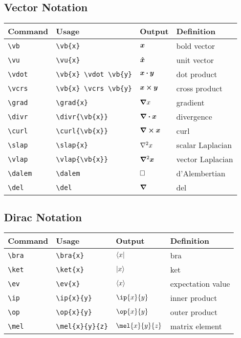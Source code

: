 \documentclass[11pt]{article}
\begin{document}
\subsection{Vector Notation}

\begin{tabular}{llll}
    Command       & Usage                      & Output                & Definition       \\
    \hline
    \verb|\vb|    & \verb|\vb{x}|              & $\bm{x}$              & bold vector      \\
    \verb|\vu|    & \verb|\vu{x}|              & $\bm{\hat{x}}$              & unit vector      \\
    \verb|\vdot|  & \verb|\vb{x} \vdot \vb{y}| & $\bm{x} \bm{\cdot} \bm{y}$ & dot product      \\
    \verb|\vcrs|  & \verb|\vb{x} \vcrs \vb{y}| & $\bm{x} \bm{\times} \bm{y}$ & cross product    \\
    \verb|\grad|  & \verb|\grad{x}|            & $\bm{\nabla} x$            & gradient         \\
    \verb|\divr|  & \verb|\divr{\vb{x}}|       & $\bm{\nabla} \bm{\cdot} \bm{x}$       & divergence       \\
    \verb|\curl|  & \verb|\curl{\vb{x}}|       & $\bm{\nabla} \bm{\times} \bm{x}$       & curl             \\
    \verb|\slap|  & \verb|\slap{x}|            & $\nabla^{2} x$            & scalar Laplacian \\
    \verb|\vlap|  & \verb|\vlap{\vb{x}}|       & $\bm{\nabla}^{2} \bm{x}$       & vector Laplacian \\
    \verb|\dalem| & \verb|\dalem|              & $\dalem$              & d'Alembertian    \\
    \verb|\del|   & \verb|\del|                & $\bm{\nabla}$                & del              \\
\end{tabular}

\subsection{Dirac Notation}

\begin{tabular}{llll}
    Command     & Usage                & Output          & Definition        \\
    \hline
    \verb|\bra| & \verb|\bra{x}|       & $\langle x\rvert$       & bra               \\
    \verb|\ket| & \verb|\ket{x}|       & $\lvert x\rangle$       & ket               \\
    \verb|\ev|  & \verb|\ev{x}|        & $\langle x\rangle$        & expectation value \\
    \verb|\ip|  & \verb|\ip{x}{y}|     & $\ip{x}{y}$     & inner product     \\
    \verb|\op|  & \verb|\op{x}{y}|     & $\op{x}{y}$     & outer product     \\
    \verb|\mel| & \verb|\mel{x}{y}{z}| & $\mel{x}{y}{z}$ & matrix element    \\
\end{tabular}
\end{document}
